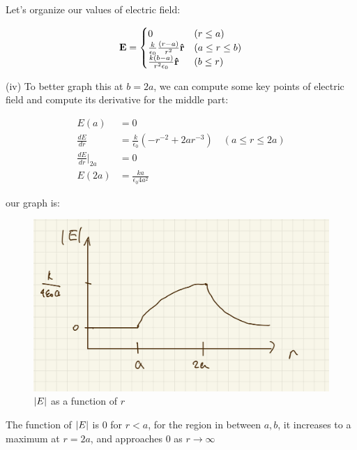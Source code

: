 \documentclass{article}
\numberwithin{equation}{section}
\numberwithin{figure}{section}
\newcommand{\vbh}[1]{\vb{\hat{#1}}}
\begin{document}
Let's organize our values of electric field:

\begin{equation}
    \vb{E} = \begin{cases}
        0 \quad &( r \leq a) \\
        \frac{k}{\epsilon_0} \frac{(r-a)}{r^2} \vbh r & (a \leq r \leq b) \\
        \frac{k(b-a)}{r^2 \epsilon_0} \vbh r & (b \leq r)
    \end{cases}
\end{equation}

(iv) To better graph this at $b = 2a$, we can compute some key points of electric field and compute its derivative for the middle part:

\begin{equation}
\begin{split}
    E(a) &= 0 \\
    \frac{dE}{dr} &= \frac{k}{\epsilon_0}(- r^{-2} + 2a r^{-3}) \quad (a \leq r \leq 2a) \\
    \frac{dE}{dr} \rvert_{2a} &= 0 \\
    E(2a) &= \frac{ka}{\epsilon_0 4a^2}
\end{split}
\end{equation}

our graph is:\begin{figure}[!htb]
    \centering
   \begin{minipage}{0.48\textwidth}
     \includegraphics[width=1.2\linewidth]{hw/hw2/3.2.jpg}
     \caption{$\abs{E}$ as a function of $r$}
   \end{minipage}
\end{figure}

The function of $\abs{E}$ is $0$ for $r<a$, for the region in between $a, b$, it increases to a maximum at $r = 2a$, and approaches $0$ as $r \to \infty$
 
\end{document}
